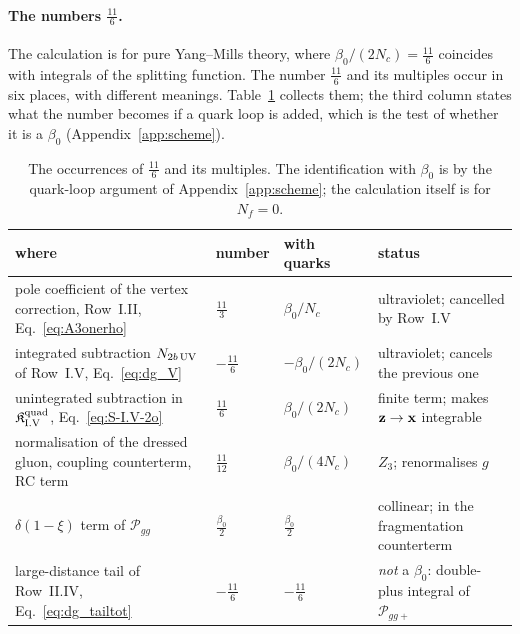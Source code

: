 \paragraph{The numbers $\frac{11}{6}$.} The calculation is for pure Yang--Mills theory, where $\beta_0/(2N_c)=\frac{11}{6}$ coincides with integrals of the splitting function. The number $\frac{11}{6}$ and its multiples occur in six places, with different meanings. Table~\ref{tab:elevens} collects them; the third column states what the number becomes if a quark loop is added, which is the test of whether it is a $\beta_0$ (Appendix~\ref{app:scheme}).
\begin{table}[t]
\centering
\renewcommand{\arraystretch}{1.25}
\footnotesize
\begin{tabular}{@{}>{\raggedright\arraybackslash}p{}>{\raggedright\arraybackslash}p{}>{\raggedright\arraybackslash}p{}>{\raggedright\arraybackslash}p{}@{}}
\toprule
where & number & with quarks & status\\
\midrule
pole coefficient of the vertex correction, Row~I.II, Eq.~\eqref{eq:A3onerho} & $\frac{11}{3}$ & $\beta_0/N_c$ & ultraviolet; cancelled by Row~I.V\\
integrated subtraction $N_{2b\,\rm UV}$ of Row~I.V, Eq.~\eqref{eq:dg_V} & $-\frac{11}{6}$ & $-\beta_0/(2N_c)$ & ultraviolet; cancels the previous one\\
unintegrated subtraction in $\mathfrak K^{\rm quad}_{\rm I.V}$, Eq.~\eqref{eq:S-I.V-2o} & $\frac{11}{6}$ & $\beta_0/(2N_c)$ & finite term; makes $\mathbf{z}\to\mathbf{x}$ integrable\\
normalisation of the dressed gluon, coupling counterterm, RC term & $\frac{11}{12}$ & $\beta_0/(4N_c)$ & $Z_3$; renormalises $g$\\
$\delta(1-\xi)$ term of $\mathcal P_{gg}$ & $\frac{\beta_0}{2}$ & $\frac{\beta_0}{2}$ & collinear; in the fragmentation counterterm\\
large-distance tail of Row~II.IV, Eq.~\eqref{eq:dg_tailtot} & $-\frac{11}{6}$ & $-\frac{11}{6}$ & \emph{not} a $\beta_0$: double-plus integral of $\mathcal P_{gg+}$\\
\bottomrule
\end{tabular}
\caption{The occurrences of $\frac{11}{6}$ and its multiples. The identification with $\beta_0$ is by the quark-loop argument of Appendix~\ref{app:scheme}; the calculation itself is for $N_f=0$.}
\label{tab:elevens}
\end{table}

